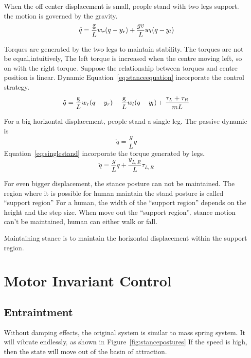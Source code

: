 \begin{itemize}
When the off center  displacement  is small, people stand with two legs support.
the motion is governed by the gravity.
\[
\ddot{q}=\frac{\mathrm{g}}{L}w_r(q-y_r)+\frac{gv}{L}w_l(q-y_l)
\]

Torques are generated by the two legs to maintain stability.
The torques are not be equal,intuitively,
The left torque is increased when the centre moving left, so on with the right torque.
Suppose the relationship between torques and centre position is linear.
Dynamic Equation~\ref{eq:stanceequation} incorporate the control strategy.
\begin{equation}
\label{eq:stanceequation}
\ddot{q}=\frac{\mathrm{g}}{L}w_r(q-y_r)+\frac{\mathrm{g}}{L}w_l(q-y_l)+\frac{\tau_L+\tau_R}{mL}
\end{equation}



For a big horizontal  displacement,  people stand a single leg.
The passive dynamic is
\[
\ddot{q}=\frac{g}{L}q
\]
Equation~\ref{eq:singlestand} incorporate the torque generated by legs.
\begin{equation}
\label{eq:singlestand}
\ddot{q}=\frac{g}{L}q+\frac{y_{L,R}}{L}\tau_{L,R}
\end{equation}

For even bigger displacement,  the stance posture can not be maintained.
The region where it is possible for human maintain the stand posture is called ``support region''
For a human, the width of the ``support region'' depends on the  height and the step size.
When move out the ``support region'', stance motion can't be maintained, human can either walk or fall.
\end{itemize}


Maintaining stance is to maintain the horizontal displacement within the support region.

\section {Motor Invariant Control}
\subsection{Entraintment}
Without damping effects, the original system is similar to mass spring system.
It will vibrate endlessly, as shown in Figure~\ref{fig:stancepostures}
If the speed is high, then the state will move out of the basin of attraction.

